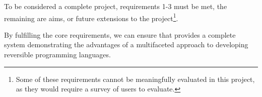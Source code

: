 To be considered a complete project, requirements 1-3 must be met, the remaining are aims, or future extensions to the project\footnote{Some of these requirements cannot be meaningfully evaluated in this project, as they would require a survey of users to evaluate.}.

By fulfilling the core requirements, we can ensure that \rimp provides a complete system demonstrating the advantages of a multifaceted approach to developing reversible programming languages. 